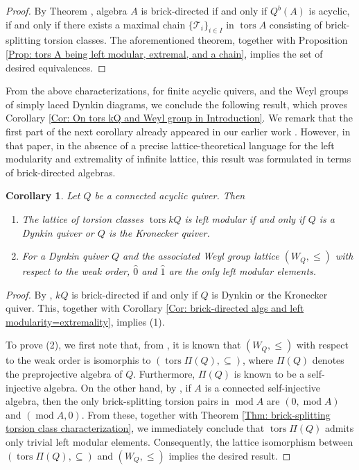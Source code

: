 \documentclass{amsart}
\theoremstyle{thmstyle}
\newtheorem{corollary}[thm]{Corollary}
\theoremstyle{exstyle}
\theoremstyle{defstyle}
\theoremstyle{remstyle}
\theoremstyle{remstyle}
\DeclareMathOperator*{\modu}{mod}
\DeclareMathOperator*{\tors}{tors}
\begin{document}
\begin{proof}
By Theorem \cite[Theorem 4.1]{AI+}, algebra $A$ is brick-directed if and only if $Q^b(A)$ is acyclic, if and only if there exists a maximal chain $\{\mathcal{T}_i\}_{i\in I}$ in $\tors A$ consisting of brick-splitting torsion classes. The aforementioned theorem, together with Proposition \ref{Prop: tors A being left modular, extremal, and a chain}, implies the set of desired equivalences.
\end{proof}

From the above characterizations, for finite acyclic quivers, and the Weyl groups of simply laced Dynkin diagrams, we conclude the following result, which proves Corollary \ref{Cor: On tors kQ and Weyl group in Introduction}. We remark that the first part of the next corollary already appeared in our earlier work \cite[Proposition 4.9]{AI+}. However, in that paper, in the absence of a precise lattice-theoretical language for the left modularity and extremality of infinite lattice, this result was formulated in terms of brick-directed algebras.

\begin{corollary}\label{Cor: On tors kQ and Weyl group}
Let $Q$ be a connected acyclic quiver. Then
\begin{enumerate}
    \item The lattice of torsion classes $\tors kQ$ is left modular if and only if $Q$ is a Dynkin quiver or $Q$ is the Kronecker quiver.
    \item For a Dynkin quiver $Q$ and the associated Weyl group lattice  $(W_Q,\leq)$ with respect to the weak order, $\hat{0}$ and $\hat{1}$ are the only left modular elements.
\end{enumerate}
\end{corollary}

\begin{proof}
By \cite[Prop. 4.9]{AI+}, $kQ$ is brick-directed if and only if $Q$ is Dynkin or the Kronecker quiver. This, together with Corollary \ref{Cor: brick-directed algs and left modularity=extremality}, implies (1).

To prove (2), we first note that, from \cite{Mi}, it is known that $(W_Q,\leq)$ with respect to the weak order is isomorphis to $(\tors \Pi(Q), \subseteq)$, where $\Pi(Q)$ denotes the preprojective algebra of $Q$. Furthermore, $\Pi(Q)$ is known to be a self-injective algebra. 
On the other hand, by \cite[Corollary 1.3]{AI+}, if $A$ is a connected self-injective algebra, then the only brick-splitting torsion pairs in $\modu A$ are $(0,\modu A)$ and $(\modu A, 0)$. From these, together with Theorem \ref{Thm: brick-splitting torsion class characterization}, we immediately conclude that $\tors \Pi(Q)$ admits only trivial left modular elements. 
Consequently, the lattice isomorphism between $(\tors \Pi(Q), \subseteq)$ and $(W_Q,\leq)$ implies the desired result.
\end{proof}
\end{document}

